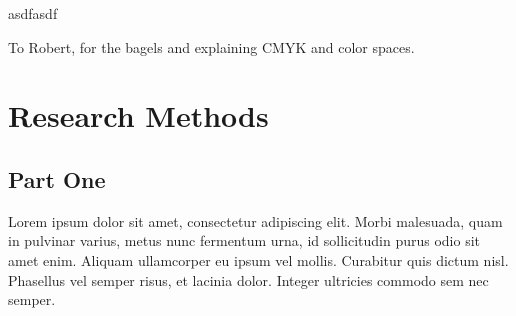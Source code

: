 \documentclass[manuscript,nonacm]{acmart}
\begin{document}
asdfasdf

\begin{acks}
To Robert, for the bagels and explaining CMYK and color spaces.
\end{acks}




\appendix
\section{Research Methods}

\subsection{Part One}

Lorem ipsum dolor sit amet, consectetur adipiscing elit. Morbi
malesuada, quam in pulvinar varius, metus nunc fermentum urna, id
sollicitudin purus odio sit amet enim. Aliquam ullamcorper eu ipsum
vel mollis. Curabitur quis dictum nisl. Phasellus vel semper risus, et
lacinia dolor. Integer ultricies commodo sem nec semper.
\end{document}
